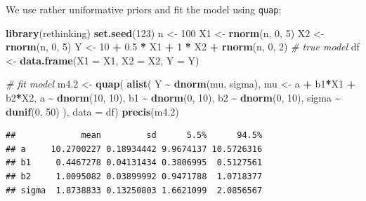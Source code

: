 \documentclass[
]{book}
\newenvironment{Shaded}{\begin{snugshade}}{\end{snugshade}}
\newcommand{\AttributeTok}[1]{\textcolor[rgb]{0.13,0.29,0.53}{#1}}
\newcommand{\CommentTok}[1]{\textcolor[rgb]{0.56,0.35,0.01}{\textit{#1}}}
\newcommand{\DecValTok}[1]{\textcolor[rgb]{0.00,0.00,0.81}{#1}}
\newcommand{\FloatTok}[1]{\textcolor[rgb]{0.00,0.00,0.81}{#1}}
\newcommand{\FunctionTok}[1]{\textcolor[rgb]{0.13,0.29,0.53}{\textbf{#1}}}
\newcommand{\NormalTok}[1]{#1}
\newcommand{\OtherTok}[1]{\textcolor[rgb]{0.56,0.35,0.01}{#1}}
\newcommand{\SpecialCharTok}[1]{\textcolor[rgb]{0.81,0.36,0.00}{\textbf{#1}}}
\begin{document}
We use rather uniformative priors and fit the model using \texttt{quap}:

\begin{Shaded}
\begin{Highlighting}[]
\FunctionTok{library}\NormalTok{(rethinking)}
\FunctionTok{set.seed}\NormalTok{(}\DecValTok{123}\NormalTok{)}
\NormalTok{n }\OtherTok{\textless{}{-}} \DecValTok{100}
\NormalTok{X1 }\OtherTok{\textless{}{-}} \FunctionTok{rnorm}\NormalTok{(n, }\DecValTok{0}\NormalTok{, }\DecValTok{5}\NormalTok{)}
\NormalTok{X2 }\OtherTok{\textless{}{-}} \FunctionTok{rnorm}\NormalTok{(n, }\DecValTok{0}\NormalTok{, }\DecValTok{5}\NormalTok{)}
\NormalTok{Y }\OtherTok{\textless{}{-}} \DecValTok{10} \SpecialCharTok{+} \FloatTok{0.5} \SpecialCharTok{*}\NormalTok{ X1 }\SpecialCharTok{+} \DecValTok{1} \SpecialCharTok{*}\NormalTok{ X2 }\SpecialCharTok{+} \FunctionTok{rnorm}\NormalTok{(n, }\DecValTok{0}\NormalTok{, }\DecValTok{2}\NormalTok{) }\CommentTok{\# true model}
\NormalTok{df }\OtherTok{\textless{}{-}} \FunctionTok{data.frame}\NormalTok{(}\AttributeTok{X1 =}\NormalTok{ X1, }\AttributeTok{X2 =}\NormalTok{ X2, }\AttributeTok{Y =}\NormalTok{ Y)}

\CommentTok{\# fit model}
\NormalTok{m4}\FloatTok{.2} \OtherTok{\textless{}{-}} \FunctionTok{quap}\NormalTok{(}
  \FunctionTok{alist}\NormalTok{(}
\NormalTok{    Y }\SpecialCharTok{\textasciitilde{}} \FunctionTok{dnorm}\NormalTok{(mu, sigma),}
\NormalTok{    mu }\OtherTok{\textless{}{-}}\NormalTok{ a }\SpecialCharTok{+}\NormalTok{ b1}\SpecialCharTok{*}\NormalTok{X1 }\SpecialCharTok{+}\NormalTok{ b2}\SpecialCharTok{*}\NormalTok{X2,}
\NormalTok{    a }\SpecialCharTok{\textasciitilde{}} \FunctionTok{dnorm}\NormalTok{(}\DecValTok{10}\NormalTok{, }\DecValTok{10}\NormalTok{),}
\NormalTok{    b1 }\SpecialCharTok{\textasciitilde{}} \FunctionTok{dnorm}\NormalTok{(}\DecValTok{0}\NormalTok{, }\DecValTok{10}\NormalTok{),}
\NormalTok{    b2 }\SpecialCharTok{\textasciitilde{}} \FunctionTok{dnorm}\NormalTok{(}\DecValTok{0}\NormalTok{, }\DecValTok{10}\NormalTok{),}
\NormalTok{    sigma }\SpecialCharTok{\textasciitilde{}} \FunctionTok{dunif}\NormalTok{(}\DecValTok{0}\NormalTok{, }\DecValTok{50}\NormalTok{)}
\NormalTok{  ), }\AttributeTok{data =}\NormalTok{ df)}
\FunctionTok{precis}\NormalTok{(m4}\FloatTok{.2}\NormalTok{)}
\end{Highlighting}
\end{Shaded}

\begin{verbatim}
##             mean         sd      5.5%      94.5%
## a     10.2700227 0.18934442 9.9674137 10.5726316
## b1     0.4467278 0.04131434 0.3806995  0.5127561
## b2     1.0095082 0.03899992 0.9471788  1.0718377
## sigma  1.8738833 0.13250803 1.6621099  2.0856567
\end{verbatim}
\end{document}
